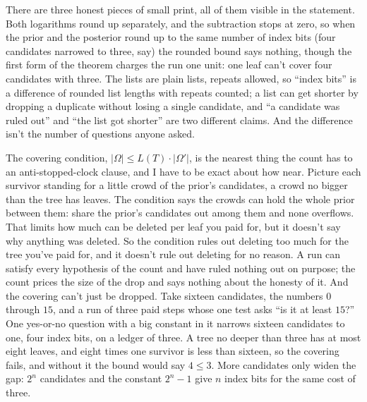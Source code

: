 \documentclass[11pt,twoside]{article}
\theoremstyle{thielethm}
\theoremstyle{thieledef}
\theoremstyle{thieledef}
\theoremstyle{thieledef}
\theoremstyle{thielethm}
\theoremstyle{thieleobs}
\theoremstyle{thielethm}
\begin{document}
There are three honest pieces of small print, all of them visible in the statement. Both logarithms round up
separately, and the subtraction stops at zero, so when the prior and the posterior round up to
the same number of index bits (four candidates narrowed to three, say) the rounded bound says nothing, though the first form of the theorem charges the run one unit: one leaf can't cover four candidates with three.
The lists are plain lists, repeats allowed, so ``index bits'' is a difference of rounded list lengths
with repeats counted; a list can get shorter by dropping a duplicate without losing a single
candidate, and ``a candidate was ruled out'' and ``the list got shorter'' are two different
claims. And the difference isn't the number of questions anyone asked.

The covering condition, $|\Omega| \le L(T) \cdot |\Omega'|$, is the nearest thing the count
has to an anti-stopped-clock clause, and I have to be exact about how near. Picture each survivor standing for a little crowd
of the prior's candidates, a crowd no bigger than the tree has leaves. The condition says the
crowds can hold the whole prior between them: share the prior's candidates out among them and none
overflows. That limits how much can be deleted per leaf you paid for, but it doesn't say
why anything was deleted. So the condition rules out deleting too much for the tree you've
paid for, and it doesn't rule out deleting for no reason. A run can satisfy every hypothesis of
the count and have ruled nothing out on purpose; the count prices the size of the drop and
says nothing about the honesty of it. And the covering can't just be dropped. Take sixteen
candidates, the numbers $0$ through $15$, and a run of three paid steps whose one test asks
``is it at least $15$?'' One yes-or-no question with a big constant in it narrows sixteen
candidates to one, four index bits, on a ledger of three. A tree no deeper than three has at
most eight leaves, and eight times one survivor is less than sixteen, so the covering fails,
and without it the bound would say $4 \le 3$. More candidates only widen the gap: $2^n$
candidates and the constant $2^n - 1$ give $n$ index bits for the same cost of three.
\end{document}
